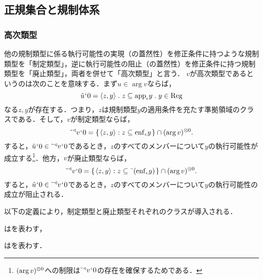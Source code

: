 
\subsection{正規集合と規制体系}
\label{ssec:正規集合と規制体系}

\subsubsection{高次類型}
\label{sssec:高次類型}

他の規制類型に係る執行可能性の実現（の蓋然性）を修正条件に持つような規制類型を「制定類型」，逆に執行可能性の阻止（の蓋然性）を修正条件に持つ規制類型を「廃止類型」，両者を併せて「高次類型」と言う．
$ v $が高次類型であるというのは次のことを意味する．まず$ u\in\arg v $ならば，
\[
    \tilde{u}\fap 0 = \orp{z,y}\con{1}z\subseteq\app{\epsilon} y\con{1}y\in\mathrm{Reg}
\]
なる$ z,y $が存在する．つまり，$z$は規制類型$y$の適用条件を充たす準拠領域のクラスである．そして，$v$が制定類型ならば，
\[
    \tilde{\:\:}{^\triangleleft}v{\mspace{1mu}{`}\mspace{1mu}} 0 = \{\mspace{2mu}\langle z,y \rangle:z\subseteq\mathrm{enf}_{\epsilon}y\mspace{2mu}\}\cap(\arg v)^{\otimes 0}.
\]
すると，$ \tilde{u}{\mspace{1mu}{`}\mspace{1mu}} 0\in \tilde{\:\:}{^\triangleleft}v{\mspace{1mu}{`}\mspace{1mu}} 0 $であるとき，$z$のすべてのメンバーについて$y$の執行可能性が成立する\footnote{
    $ (\arg v)^{\otimes 0} $への制限は$ \tilde{\:\:}{^\triangleleft}v{\mspace{1mu}{`}\mspace{1mu}} 0 $の存在を確保するためである．
}．他方，$v$が廃止類型ならば，
\[
    \tilde{\:\:}{^\triangleleft}v{\mspace{1mu}{`}\mspace{1mu}} 0 = \{\mspace{2mu}\langle z,y \rangle:z\subseteq\bar{\:\:}(\mathrm{enf}_{\epsilon}y)\mspace{2mu}\}\cap(\arg v)^{\otimes 0}.
\]
すると，$ \tilde{u}{\mspace{1mu}{`}\mspace{1mu}} 0\in \tilde{\:\:}{^\triangleleft}v{\mspace{1mu}{`}\mspace{1mu}} 0 $であるとき，$z$のすべてのメンバーについて$y$の執行可能性の成立が阻止される．

以下の定義により，制定類型と廃止類型それぞれのクラスが導入される．

\begin{df}
\label{df:制定類型}
はを表わす，
\end{df}

\begin{df}
\label{df:廃止類型}
はを表わす．
\end{df}

